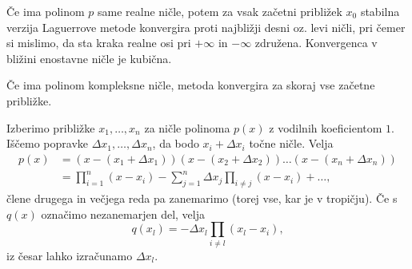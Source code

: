 \begin{izrek}
  Če ima polinom $p$ same realne ničle, potem za vsak začetni približek $x_0$
  stabilna verzija Laguerrove metode konvergira proti najbližji desni oz. levi
  ničli, pri čemer si mislimo, da sta kraka realne osi pri $+\infty$ in
  $-\infty$ združena.
  Konvergenca v bližini enostavne ničle je kubična.
\end{izrek}

Če ima polinom kompleksne ničle, metoda konvergira za skoraj vse začetne
približke.



Izberimo približke $x_1, \ldots, x_n$ za ničle polinoma $p(x)$ z vodilnih
koeficientom $1$.
Iščemo popravke $\Delta x_1, \ldots, \Delta x_n$, da bodo $x_i + \Delta x_i$
točne ničle.
Velja
\begin{align*}
  p(x)
  &= (x - (x_1 + \Delta x_1)) (x - (x_2 + \Delta x_2)) \ldots (x - (x_n
  + \Delta x_n)) \\
  &= \prod_{i=1}^n (x-x_i) - \sum_{j=1}^n \Delta x_j \prod_{i \ne j} (x - x_i)
  + \ldots,
\end{align*}
člene drugega in večjega reda pa zanemarimo (torej vse, kar je v tropičju).
Če s $q(x)$ označimo nezanemarjen del, velja
\[
  q(x_l) = - \Delta x_l \prod_{i \ne l} (x_l - x_i),
\]
iz česar lahko izračunamo $\Delta x_l$.

